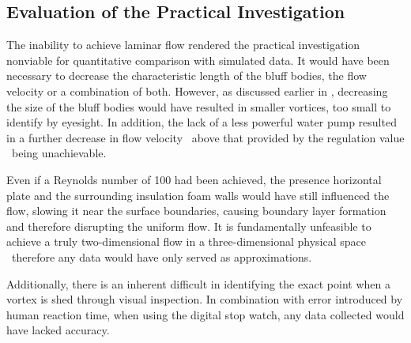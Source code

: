 \subsection{Evaluation of the Practical Investigation}
The inability to achieve laminar flow rendered the practical investigation nonviable for quantitative comparison with simulated data. It would have been necessary to decrease the characteristic length of the bluff bodies, the flow velocity or a combination of both. However, as discussed earlier in , decreasing the size of the bluff bodies would have resulted in smaller vortices, too small to identify by eyesight. In addition, the lack of a less powerful water pump resulted in a further decrease in flow velocity \textemdash\ above that provided by the regulation value \textemdash\ being unachievable.

Even if a Reynolds number of 100 had been achieved, the presence horizontal plate and the surrounding insulation foam walls would have still influenced the flow, slowing it near the surface boundaries, causing boundary layer formation and therefore disrupting the uniform flow. It is fundamentally unfeasible to achieve a truly two-dimensional flow in a three-dimensional physical space \textemdash\ therefore any data would have only served as approximations. 

Additionally, there is an inherent difficult in identifying the exact point when a vortex is shed through visual inspection. In combination with error introduced by human reaction time, when using the digital stop watch, any data collected would have lacked accuracy.

